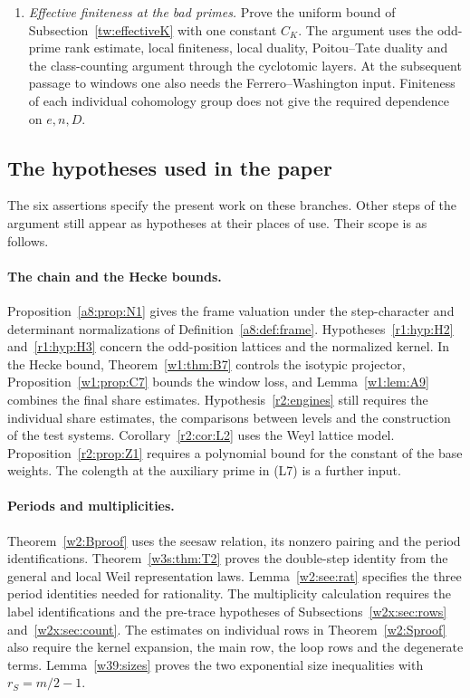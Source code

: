 \begin{enumerate}[labelwidth=2.4em,leftmargin=3em,itemsep=5pt]
\item[\textup{(K1)}] \emph{Effective finiteness at the bad primes.} Prove the uniform
bound of Subsection~\ref{tw:effectiveK} with one constant $C_K$. The
argument uses the odd-prime rank estimate, local finiteness, local
duality, Poitou--Tate duality and the class-counting argument through
the cyclotomic layers. At the subsequent passage to windows one also
needs the Ferrero--Washington input. Finiteness of each individual
cohomology group does not give the required dependence on $e,n,D$.
\end{enumerate}

\subsection{The hypotheses used in the paper}

The six assertions specify the present work on these branches. Other
steps of the argument still appear as hypotheses at their places of use.
Their scope is as follows.

\paragraph{The chain and the Hecke bounds.}\label{fr:sec:chain}\label{fr:sec:loss}
Proposition~\ref{a8:prop:N1} gives the frame valuation under the step-character
and determinant normalizations of Definition~\ref{a8:def:frame}.
Hypotheses~\ref{r1:hyp:H2} and~\ref{r1:hyp:H3} concern the odd-position
lattices and the normalized kernel. In the Hecke bound, Theorem~\ref{w1:thm:B7}
controls the isotypic projector, Proposition~\ref{w1:prop:C7} bounds the
window loss, and Lemma~\ref{w1:lem:A9} combines the final share estimates.
Hypothesis~\ref{r2:engines} still requires the individual share estimates,
the comparisons between levels and the construction of the test systems.
Corollary~\ref{r2:cor:L2} uses the Weyl lattice model. Proposition~\ref{r2:prop:Z1}
requires a polynomial bound for the constant of the base weights.
The colength at the auxiliary prime in (L7) is a further input.

\paragraph{Periods and multiplicities.}\label{fr:sec:frame}
Theorem~\ref{w2:Bproof} uses the seesaw relation, its nonzero pairing
and the period identifications. Theorem~\ref{w3s:thm:T2} proves the
double-step identity from the general and local Weil representation
laws. Lemma~\ref{w2:see:rat} specifies the three period identities
needed for rationality. The multiplicity calculation requires the
label identifications and the pre-trace hypotheses of
Subsections~\ref{w2x:sec:rows} and~\ref{w2x:sec:count}.
The estimates on individual rows in Theorem~\ref{w2:Sproof} also
require the kernel expansion, the main row, the loop rows and the
degenerate terms. Lemma~\ref{w39:sizes} proves the two exponential
size inequalities with $r_S=m/2-1$.

